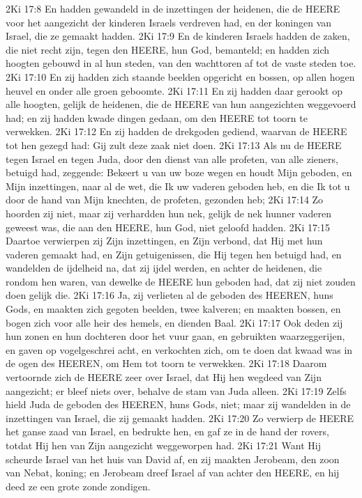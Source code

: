 2Ki 17:8  En hadden gewandeld in de inzettingen der heidenen, die de HEERE voor het aangezicht der kinderen Israels verdreven had, en der koningen van Israel, die ze gemaakt hadden.
2Ki 17:9  En de kinderen Israels hadden de zaken, die niet recht zijn, tegen den HEERE, hun God, bemanteld; en hadden zich hoogten gebouwd in al hun steden, van den wachttoren af tot de vaste steden toe.
2Ki 17:10  En zij hadden zich staande beelden opgericht en bossen, op allen hogen heuvel en onder alle groen geboomte.
2Ki 17:11  En zij hadden daar gerookt op alle hoogten, gelijk de heidenen, die de HEERE van hun aangezichten weggevoerd had; en zij hadden kwade dingen gedaan, om den HEERE tot toorn te verwekken.
2Ki 17:12  En zij hadden de drekgoden gediend, waarvan de HEERE tot hen gezegd had: Gij zult deze zaak niet doen.
2Ki 17:13  Als nu de HEERE tegen Israel en tegen Juda, door den dienst van alle profeten, van alle zieners, betuigd had, zeggende: Bekeert u van uw boze wegen en houdt Mijn geboden, en Mijn inzettingen, naar al de wet, die Ik uw vaderen geboden heb, en die Ik tot u door de hand van Mijn knechten, de profeten, gezonden heb;
2Ki 17:14  Zo hoorden zij niet, maar zij verhardden hun nek, gelijk de nek hunner vaderen geweest was, die aan den HEERE, hun God, niet geloofd hadden.
2Ki 17:15  Daartoe verwierpen zij Zijn inzettingen, en Zijn verbond, dat Hij met hun vaderen gemaakt had, en Zijn getuigenissen, die Hij tegen hen betuigd had, en wandelden de ijdelheid na, dat zij ijdel werden, en achter de heidenen, die rondom hen waren, van dewelke de HEERE hun geboden had, dat zij niet zouden doen gelijk die.
2Ki 17:16  Ja, zij verlieten al de geboden des HEEREN, huns Gods, en maakten zich gegoten beelden, twee kalveren; en maakten bossen, en bogen zich voor alle heir des hemels, en dienden Baal.
2Ki 17:17  Ook deden zij hun zonen en hun dochteren door het vuur gaan, en gebruikten waarzeggerijen, en gaven op vogelgeschrei acht, en verkochten zich, om te doen dat kwaad was in de ogen des HEEREN, om Hem tot toorn te verwekken.
2Ki 17:18  Daarom vertoornde zich de HEERE zeer over Israel, dat Hij hen wegdeed van Zijn aangezicht; er bleef niets over, behalve de stam van Juda alleen.
2Ki 17:19  Zelfs hield Juda de geboden des HEEREN, huns Gods, niet; maar zij wandelden in de inzettingen van Israel, die zij gemaakt hadden.
2Ki 17:20  Zo verwierp de HEERE het ganse zaad van Israel, en bedrukte hen, en gaf ze in de hand der rovers, totdat Hij hen van Zijn aangezicht weggeworpen had.
2Ki 17:21  Want Hij scheurde Israel van het huis van David af, en zij maakten Jerobeam, den zoon van Nebat, koning; en Jerobeam dreef Israel af van achter den HEERE, en hij deed ze een grote zonde zondigen.
